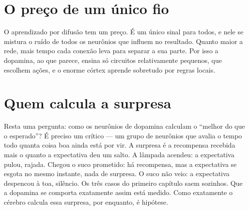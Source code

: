 \section*{O preço de um único fio}

O aprendizado por difusão tem um preço. É um único sinal para todos, e nele se mistura o ruído de todos os neurônios que influem no resultado. Quanto maior a rede, mais tempo cada conexão leva para separar a sua parte. Por isso a dopamina, ao que parece, ensina só circuitos relativamente pequenos, que escolhem ações, e o enorme córtex aprende sobretudo por regras locais.

\section*{Quem calcula a surpresa}

Resta uma pergunta: como os neurônios de dopamina calculam o ``melhor do que o esperado''? É preciso um crítico --- um grupo de neurônios que avalia o tempo todo quanta coisa boa ainda está por vir. A surpresa é a recompensa recebida mais o quanto a expectativa deu um salto. A lâmpada acendeu: a expectativa pulou, rajada. Chegou o suco prometido: há recompensa, mas a expectativa se esgota no mesmo instante, nada de surpresa. O suco não veio: a expectativa despencou à toa, silêncio. Os três casos do primeiro capítulo saem sozinhos. Que a dopamina se comporta exatamente assim está medido. Como exatamente o cérebro calcula essa surpresa, por enquanto, é hipótese.

